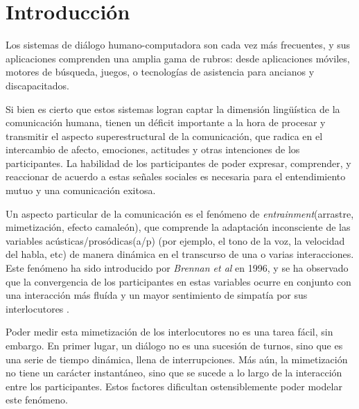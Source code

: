 
\section{Introducción}

Los sistemas de diálogo humano-computadora son cada vez más frecuentes, y sus aplicaciones comprenden una amplia gama de rubros: desde aplicaciones móviles, motores de búsqueda, juegos, o tecnologías de asistencia para ancianos y discapacitados.

Si bien es cierto que estos sistemas logran captar la dimensión lingüística de la comunicación humana, tienen un déficit importante a la hora de procesar y transmitir el aspecto superestructural de la comunicación, que radica en el intercambio de afecto, emociones, actitudes y otras intenciones de los participantes. La habilidad de los participantes de poder expresar, comprender, y reaccionar de acuerdo a estas señales sociales es necesaria para el entendimiento mutuo y una comunicación exitosa.

Un aspecto particular de la comunicación es el fenómeno de \emph{entrainment}(arrastre, mimetización, efecto camaleón), que comprende la adaptación inconsciente de las variables acústicas/prosódicas(a/p) (por ejemplo, el tono de la voz, la velocidad del habla, etc) de manera dinámica en el transcurso de una o varias interacciones. Este fenómeno ha sido introducido por \emph{Brennan et al}\cite{BRE1996} en 1996, y se ha observado que la convergencia de los participantes en estas variables ocurre en conjunto con una interacción más fluída y un mayor sentimiento de simpatía por sus interlocutores \cite{CHAR1999}.

Poder medir esta mimetización de los interlocutores no es una tarea fácil, sin embargo. En primer lugar, un diálogo no es una sucesión de turnos, sino que es una serie de tiempo dinámica, llena de interrupciones. Más aún, la mimetización no tiene un carácter instantáneo, sino que se sucede a lo largo de la interacción entre los participantes. Estos factores dificultan ostensiblemente poder modelar este fenómeno.
